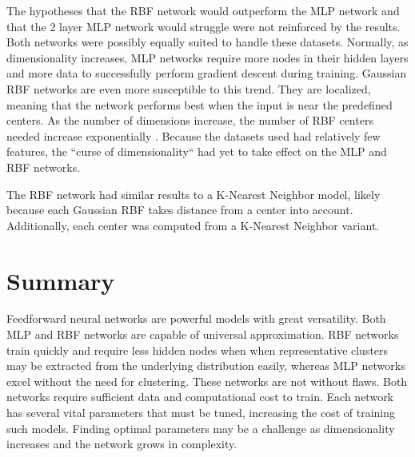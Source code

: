 \documentclass[twoside,10pt]{article}
\begin{document}
	The hypotheses that the RBF network would outperform the MLP network and that the 2 layer MLP network would struggle were not reinforced by the results. Both networks were possibly equally suited to handle these datasets. Normally, as dimensionality increases, MLP networks require more nodes in their hidden layers and more data to successfully perform gradient descent during training. Gaussian RBF networks are even more susceptible to this trend. They are localized, meaning that the network performs best when the input is near the predefined centers. As the number of dimensions increase, the number of RBF centers needed increase exponentially \citep{rbf}. Because the datasets used had relatively few features, the ``curse of dimensionality`` had yet to take effect on the MLP and RBF networks.
	
	The RBF network had similar results to a K-Nearest Neighbor model, likely because each Gaussian RBF takes distance from a center into account. Additionally, each center was computed from a K-Nearest Neighbor variant.

\section{Summary}

	Feedforward neural networks are powerful models with great versatility. Both MLP and RBF networks are capable of universal approximation. RBF networks train quickly and require less hidden nodes when when representative clusters may be extracted from the underlying distribution easily, whereas MLP networks excel without the need for clustering. These networks are not without flaws. Both networks require sufficient data and computational cost to train. Each network has several vital parameters that must be tuned, increasing the cost of training such models. Finding optimal parameters may be a challenge as dimensionality increases and the network grows in complexity. 


\end{document}
